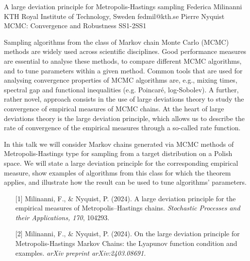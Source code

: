 \begin{talk}
  {A large deviation principle for Metropolis-Hastings sampling}%
  {Federica Milinanni}%
  {KTH Royal Institute of Technology, Sweden}%
  {fedmil@kth.se}%
  {Pierre Nyquist}%
{MCMC: Convergence and Robustness}
{}{SS1-2}{SS1}

			
Sampling algorithms from the class of Markov chain Monte Carlo (MCMC) methods are widely used across scientific disciplines. Good performance measures are essential to analyse these methods, to compare different MCMC algorithms, and to tune parameters within a given method. Common tools that are used for analysing convergence properties of MCMC algorithms are, e.g., mixing times, spectral gap and functional inequalities (e.g. Poincaré, log-Sobolev). A further, rather novel, approach consists in the use of large deviations theory to study the convergence of empirical measures of MCMC chains. At the heart of large deviations theory is the large deviation principle, which allows us to describe the rate of convergence of the empirical measures through a so-called rate function.

In this talk we will consider Markov chains generated via MCMC methods of Metropolis-Hastings type for sampling from a target distribution on a Polish space. We will state a large deviation principle for the corresponding empirical measure, show examples of algorithms from this class for which the theorem applies, and illustrate how the result can be used to tune algorithms' parameters.

\medskip

\begin{enumerate}
	\item[{[1]}] Milinanni, F., \& Nyquist, P. (2024). A large deviation principle for the empirical measures of Metropolis–Hastings chains. \textit{Stochastic Processes and their Applications, 170}, 104293.
	\item[{[2]}] Milinanni, F., \& Nyquist, P. (2024). On the large deviation principle for Metropolis-Hastings Markov Chains: the Lyapunov function condition and examples. \textit{arXiv preprint arXiv:2403.08691.}
\end{enumerate}


\end{talk}

